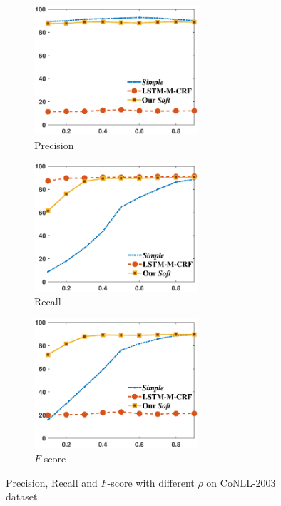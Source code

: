 \begin{figure}[h!]
	\centering
	\begin{subfigure}{0.45\linewidth}
		\centering
		\includegraphics[width=2.4in]{Figures/conll2003precision.eps}
		\caption{Precision}
	\end{subfigure}
	\begin{subfigure}{0.45\linewidth}
		\centering
		\includegraphics[width=2.4in]{Figures/conll2003recall.eps}
		\caption{Recall}
	\end{subfigure}
	\begin{subfigure}{0.45\linewidth}
		\centering
		\includegraphics[width=2.4in]{Figures/conll2003.eps}
		\caption{$F$-score}
	\end{subfigure}
	\caption{Precision, Recall and $F$-score with different $\rho$ on CoNLL-2003 dataset. }
	\label{fig:diffp}
\end{figure}


